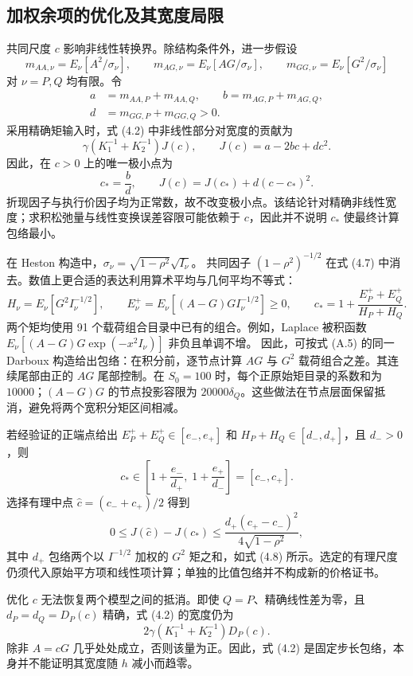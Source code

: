 \subsection{加权余项的优化及其宽度局限}

共同尺度 \(c\) 影响非线性转换界。除结构条件外，进一步假设
\[
m_{AA,\nu}=E_\nu[A^2/\sigma_\nu],\qquad
m_{AG,\nu}=E_\nu[AG/\sigma_\nu],\qquad
m_{GG,\nu}=E_\nu[G^2/\sigma_\nu]
\]
对 \(\nu=P,Q\) 均有限。令
\[
\begin{aligned}
a&=m_{AA,P}+m_{AA,Q},\qquad b=m_{AG,P}+m_{AG,Q},\\
d&=m_{GG,P}+m_{GG,Q}>0.
\end{aligned}
\]
采用精确矩输入时，式 (4.2) 中非线性部分对宽度的贡献为
\[
\gamma\left(K_1^{-1}+K_2^{-1}\right)J(c),\qquad
J(c)=a-2bc+dc^2.
\]
因此，在 \(c>0\) 上的唯一极小点为
\[
c_* = \frac{b}{d},\qquad
J(c)=J(c_*)+d(c-c_*)^2.                         \tag{4.7}
\]
折现因子与执行价因子均为正常数，故不改变极小点。该结论针对精确非线性宽度；求积松弛量与线性变换误差容限可能依赖于 \(c\)，因此并不说明 \(c_*\) 使最终计算包络最小。

在 Heston 构造中，\(\sigma_\nu=\sqrt{1-\rho^2}\sqrt{I_\nu}\)。
共同因子 \((1-\rho^2)^{-1/2}\) 在式 (4.7) 中消去。数值上更合适的表达利用算术平均与几何平均不等式：
\[
H_\nu=E_\nu[G^2I_\nu^{-1/2}],\qquad
E_\nu^+=E_\nu[(A-G)GI_\nu^{-1/2}]\ge0,
\qquad
c_* =1+\frac{E_P^++E_Q^+}{H_P+H_Q}.             \tag{4.8}
\]
两个矩均使用 91 个载荷组合目录中已有的组合。例如，Laplace 被积函数
\(E_\nu[(A-G)G\exp(-x^2I_\nu)]\) 非负且单调不增。
因此，可按式 (A.5) 的同一 Darboux 构造给出包络：在积分前，逐节点计算 \(AG\) 与 \(G^2\) 载荷组合之差。其连续尾部由正的
\(AG\) 尾部控制。在 \(S_0=100\) 时，每个正原始矩目录的系数和为
\(10000\)；\((A-G)G\) 的节点投影容限为
\(20000\delta_Q\)。这些做法在节点层面保留抵消，避免将两个宽积分矩区间相减。

若经验证的正端点给出
\(E_P^++E_Q^+\in[e_-,e_+]\) 和 \(H_P+H_Q\in[d_-,d_+]\)，且
\(d_->0\)，则
\[
c_*\in\left[1+\frac{e_-}{d_+},\;1+\frac{e_+}{d_-}\right]=[c_-,c_+].
\]
选择有理中点 \(\widehat c=(c_-+c_+)/2\) 得到
\[
0\le J(\widehat c)-J(c_*)
\le \frac{d_+(c_+-c_-)^2}{4\sqrt{1-\rho^2}},    \tag{4.9}
\]
其中 \(d_+\) 包络两个以 \(I^{-1/2}\) 加权的
\(G^2\) 矩之和，如式 (4.8) 所示。选定的有理尺度仍须代入原始平方项和线性项计算；单独的比值包络并不构成新的价格证书。

优化 \(c\) 无法恢复两个模型之间的抵消。即使
\(Q=P\)、精确线性差为零，且 \(d_P=d_Q=D_P(c)\) 精确，式 (4.2) 的宽度仍为
\[
2\gamma\left(K_1^{-1}+K_2^{-1}\right)D_P(c).
\]
除非 \(A=cG\) 几乎处处成立，否则该量为正。因此，式 (4.2) 是固定步长包络，本身并不能证明其宽度随
\(h\) 减小而趋零。


